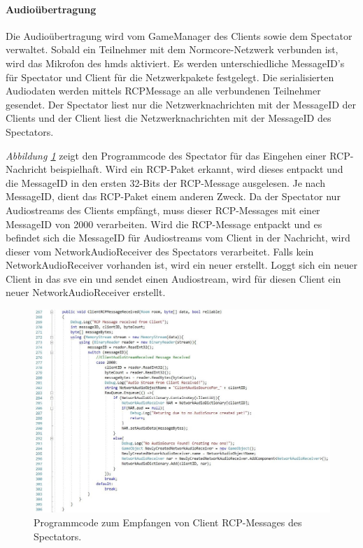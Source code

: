\documentclass[a4paper,11pt]{article}%
\renewcommand{\\}{\vspace*{0.5\baselineskip} \newline}
\begin{document}
\paragraph{Audioübertragung}
Die Audioübertragung wird vom GameManager des Clients sowie dem Spectator verwaltet. Sobald ein Teilnehmer mit dem Normcore-Netzwerk verbunden ist, wird das Mikrofon des \ac{hmd}s aktiviert. Es werden unterschiedliche MessageID’s für Spectator und Client für die Netzwerkpakete festgelegt. Die serialisierten Audiodaten werden mittels RCPMessage an alle verbundenen Teilnehmer gesendet. Der Spectator liest nur die Netzwerknachrichten mit der MessageID der Clients und der Client liest die Netzwerknachrichten mit der MessageID des Spectators.

\textit{Abbildung \ref{ClientRCPMessageReceived}} zeigt den Programmcode des Spectator für das Eingehen einer RCP-Nachricht beispielhaft. Wird ein RCP-Paket erkannt, wird dieses entpackt und die MessageID in den ersten 32-Bits der RCP-Message ausgelesen. Je nach MessageID, dient das RCP-Paket einem anderen Zweck. Da der Spectator nur Audiostreams des Clients empfängt, muss dieser RCP-Messages mit einer MessageID von \glqq{}2000\dq{} verarbeiten. 
Wird die RCP-Message entpackt und es befindet sich die MessageID für Audiostreams vom Client in der Nachricht, wird dieser vom \glqq{}NetworkAudioReceiver\dq{} des Spectators verarbeitet. Falls kein \glqq{}NetworkAudioReceiver\dq{} vorhanden ist, wird ein neuer erstellt. Loggt sich ein neuer Client in das \ac{sve} ein und sendet einen Audiostream, wird für diesen Client ein neuer \glqq{}NetworkAudioReceiver\dq{} erstellt.

\begin{figure}[H]
		\begin{footnotesize}
		\centering
			\includegraphics[width=\textwidth]{Abbildungen/ClientRCPMessageReceived.jpg}	
			\caption[RCP-Message Handling]{Programmcode zum Empfangen von Client RCP-Messages des Spectators.}
			\label{ClientRCPMessageReceived}
		\end{footnotesize}
	\end{figure}
	
\end{document}
